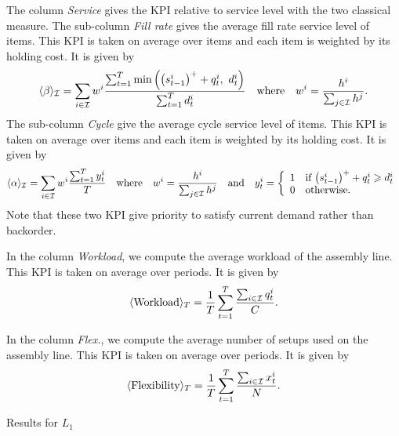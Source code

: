 The column \emph{Service} gives the KPI relative to service level with the two classical measure.
The sub-column \emph{Fill rate} gives the average fill rate service level of items.
This KPI is taken on average over items and each item is weighted by its holding cost.
It is given by
\begin{equation}\label{eq:pdp:numerical-experiments:KPI:fill-rate-service-level}
  \left<\beta\right>_{\REF} = \sum_{i\in\REF} w^i \frac{\sum_{t=1}^{\horizon}\min\bracket{\bracket{\inventory_{t-1}^i}^++\quantity_t^i,\ \demand_t^i}}{\sum_{t=1}^{\horizon}\demand_t^i}
  \quad\mbox{where}\quad
  w^i=\frac{\holding^i}{\sum_{j\in\REF}\holding^j}.
\end{equation}
The sub-column \emph{Cycle} give the average cycle service level of items.
This KPI is taken on average over items and each item is weighted by its holding cost.
It is given by
\begin{equation}\label{eq:pdp:numerical-experiments:KPI:cycle-service-level}
  \left<\alpha\right>_{\REF} = \sum_{i\in\REF} w^i\frac{\sum_{t=1}^{\horizon} y_t^i}{\horizon}
  \quad\mbox{where}\quad
  w^i=\frac{\holding^i}{\sum_{j\in\REF}\holding^j}
  \quad\mbox{and}\quad
  y_t^i =
  \left\{
  \begin{array}{ll}
  1 & \mbox{if}\ \bracket{\inventory_{t-1}^i}^++\quantity_t^i\ge\demand_t^i \\
  0 & \mbox{otherwise}.
  \end{array}
  \right.
\end{equation}
Note that these two KPI give priority to satisfy current demand rather than backorder.


In the column \emph{Workload}, we compute the average workload of the assembly line.
This KPI is taken on average over periods.
It is given by
\begin{equation}
  \left<\mbox{Workload}\right>_{\horizon} = \frac{1}{\horizon} \sum_{t=1}^{\horizon} \frac{\sum_{i\in\REF} \quantity_t^i}{\capacity}.
\end{equation}


In the column \emph{Flex.}, we compute the average number of setups used on the assembly line.
This KPI is taken on average over periods.
It is given by
\begin{equation}
  \left<\mbox{Flexibility}\right>_{\horizon} = \frac{1}{\horizon} \sum_{t=1}^{\horizon} \frac{\sum_{i\in\REF} \setup_t^i}{\nbsetups}.
\end{equation}


\begin{table}[!ht]

\caption{Results for $L_1$}
\label{tab:pdp:results:line-1}
\end{table}


